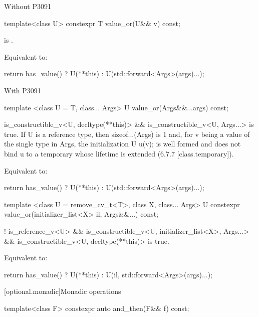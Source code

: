   Without P3091
  \begin{itemdecl}
    template<class U> constexpr T value_or(U&& v) const;
  \end{itemdecl}

  \begin{itemdescr}
    \pnum
    \mandates
     is .

    \pnum
    \effects
    Equivalent to:

    return has_value() ? U(**this) : U(std::forward<Args>(args)...);
  \end{itemdescr}

  With P3091
  \begin{itemdecl}
  template <class U = T, class... Args>
    U value_or(Args&&...args) const;
  \end{itemdecl}

  \begin{itemdescr}
    \pnum
    \mandates
    is_constructible_v<U, decltype(**this)> \&\& is_constructible_v<U, Args...>
is true. If U is a reference type, then sizeof...(Args) is 1 and, for v being a value of the single type in Args, the initialization U u(v); is well formed and does not bind u to a temporary whose lifetime is extended (6.7.7 [class.temporary]).

\pnum
\effects
Equivalent to:

return has_value() ? U(**this) : U(std::forward<Args>(args)...);
  \end{itemdescr}

  \begin{itemdecl}
template <class U = remove_cv_t<T>, class X, class... Args>
  U constexpr value_or(initializer_list<X> il, Args&&...) const;
\end{itemdecl}

\begin{itemdescr}
    \pnum
    \mandates
   ! is_reference_v<U> \&\& is_constructible_v<U, initializer_list<X>, Args...> \&\&
is_constructible_v<U, decltype(**this)> is true.

  \pnum
    \effects
   Equivalent to:

   return has_value() ? U(**this) : U(il, std::forward<Args>(args)...);
\end{itemdescr}

  [optional.monadic]{Monadic operations}

  \begin{itemdecl}
    template<class F> constexpr auto and_then(F&& f) const;
  \end{itemdecl}

